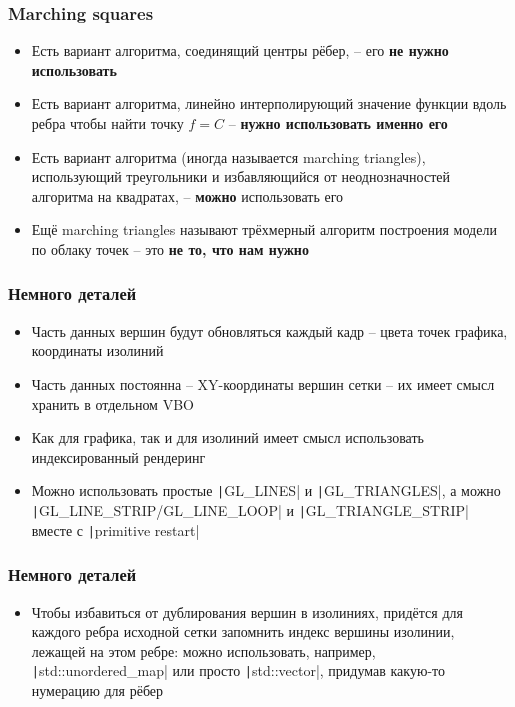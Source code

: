 \documentclass{beamer}
\begin{document}
\begin{frame}[fragile]
\frametitle{Marching squares}
\begin{itemize}
\item Есть вариант алгоритма, соединящий центры рёбер, -- его \textbf{\alert{не нужно использовать}}
\item Есть вариант алгоритма, линейно интерполирующий значение функции вдоль ребра чтобы найти точку \begin{math}f = C\end{math} -- \textbf{\alert{нужно использовать именно его}}
\pause
\item Есть вариант алгоритма (иногда называется marching triangles), использующий треугольники и избавляющийся от неоднозначностей алгоритма на квадратах, -- \textbf{\alert{можно}} использовать его
\pause
\item Ещё marching triangles называют трёхмерный алгоритм построения модели по облаку точек -- это \textbf{\alert{не то, что нам нужно}}
\end{itemize}
\end{frame}

\begin{frame}[fragile]
\frametitle{Немного деталей}
\begin{itemize}
\item Часть данных вершин будут обновляться каждый кадр -- цвета точек графика, координаты изолиний
\item Часть данных постоянна -- XY-координаты вершин сетки -- их имеет смысл хранить в отдельном VBO
\item Как для графика, так и для изолиний имеет смысл использовать индексированный рендеринг
\item Можно использовать простые \texttt|GL_LINES| и \texttt|GL_TRIANGLES|, а можно \texttt|GL_LINE_STRIP/GL_LINE_LOOP| и \texttt|GL_TRIANGLE_STRIP| вместе с \texttt|primitive restart|
\end{itemize}
\end{frame}

\begin{frame}[fragile]
\frametitle{Немного деталей}
\begin{itemize}
\item Чтобы избавиться от дублирования вершин в изолиниях, придётся для каждого ребра исходной сетки запомнить индекс вершины изолинии, лежащей на этом ребре: можно использовать, например, \texttt|std::unordered_map| или просто \texttt|std::vector|, придумав какую-то нумерацию для рёбер
\end{itemize}
\end{frame}
\end{document}
